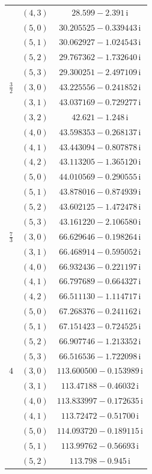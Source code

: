 \begin{table}[H]
\begin{minipage}[t]{0.325\textwidth}
\begin{tabular}[t]{|c|c|c|}
 & $(4,3)$ & $28.599-2.391\,\mathrm{i}$ \\
 & $(5,0)$ & $30.205525-0.339443\,\mathrm{i}$ \\
 & $(5,1)$ & $30.062927-1.024543\,\mathrm{i}$ \\
 & $(5,2)$ & $29.767362-1.732640\,\mathrm{i}$ \\
 & $(5,3)$ & $29.300251-2.497109\,\mathrm{i}$ \\
\hline
$\tfrac32$ & $(3,0)$ & $43.225556-0.241852\,\mathrm{i}$ \\
 & $(3,1)$ & $43.037169-0.729277\,\mathrm{i}$ \\
 & $(3,2)$ & $42.621-1.248\,\mathrm{i}$ \\
 & $(4,0)$ & $43.598353-0.268137\,\mathrm{i}$ \\
 & $(4,1)$ & $43.443094-0.807878\,\mathrm{i}$ \\
 & $(4,2)$ & $43.113205-1.365120\,\mathrm{i}$ \\
 & $(5,0)$ & $44.010569-0.290555\,\mathrm{i}$ \\
 & $(5,1)$ & $43.878016-0.874939\,\mathrm{i}$ \\
 & $(5,2)$ & $43.602125-1.472478\,\mathrm{i}$ \\
 & $(5,3)$ & $43.161220-2.106580\,\mathrm{i}$ \\
\hline
$\tfrac73$ & $(3,0)$ & $66.629646-0.198264\,\mathrm{i}$ \\
 & $(3,1)$ & $66.468914-0.595052\,\mathrm{i}$ \\
 & $(4,0)$ & $66.932436-0.221197\,\mathrm{i}$ \\
 & $(4,1)$ & $66.797689-0.664327\,\mathrm{i}$ \\
 & $(4,2)$ & $66.511130-1.114717\,\mathrm{i}$ \\
 & $(5,0)$ & $67.268376-0.241162\,\mathrm{i}$ \\
 & $(5,1)$ & $67.151423-0.724525\,\mathrm{i}$ \\
 & $(5,2)$ & $66.907746-1.213352\,\mathrm{i}$ \\
 & $(5,3)$ & $66.516536-1.722098\,\mathrm{i}$ \\
\hline
$4$ & $(3,0)$ & $113.600500-0.153989\,\mathrm{i}$ \\
 & $(3,1)$ & $113.47188-0.46032\,\mathrm{i}$ \\
 & $(4,0)$ & $113.833997-0.172635\,\mathrm{i}$ \\
 & $(4,1)$ & $113.72472-0.51700\,\mathrm{i}$ \\
 & $(5,0)$ & $114.093720-0.189115\,\mathrm{i}$ \\
 & $(5,1)$ & $113.99762-0.56693\,\mathrm{i}$ \\
 & $(5,2)$ & $113.798-0.945\,\mathrm{i}$ \\
\hline
\end{tabular}
\end{minipage}
\endgroup
\end{table}
